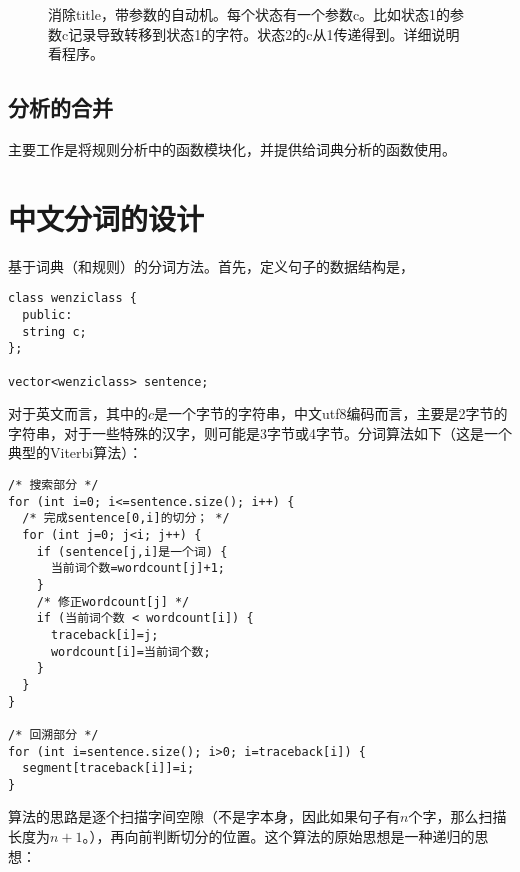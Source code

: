 \documentclass{article}
\begin{document}
\begin{CJK}{UTF8}{gbsn}
\begin{figure}
\begin{center}
\end{center}
\caption{消除title，带参数的自动机。每个状态有一个参数c。比如状态1的参数c记录导致转移到状态1的字符。状态2的c从1传递得到。详细说明看程序。}
\label{fig:title}
\end{figure}

\subsection{分析的合并}

主要工作是将规则分析中的函数模块化，并提供给词典分析的函数使用。

\section{中文分词的设计}

基于词典（和规则）的分词方法。首先，定义句子的数据结构是，

\begin{verbatim}
class wenziclass {
  public:
  string c;
};

vector<wenziclass> sentence;
\end{verbatim}

对于英文而言，其中的$c$是一个字节的字符串，中文utf8编码而言，主要是2字节的字符串，对于一些特殊的汉字，则可能是3字节或4字节。分词算法如下（这是一个典型的Viterbi算法）：

\begin{verbatim}
/* 搜索部分 */
for (int i=0; i<=sentence.size(); i++) {
  /* 完成sentence[0,i]的切分； */
  for (int j=0; j<i; j++) {
    if (sentence[j,i]是一个词) {
      当前词个数=wordcount[j]+1;
    }
    /* 修正wordcount[j] */
    if (当前词个数 < wordcount[i]) {
      traceback[i]=j;
      wordcount[i]=当前词个数;
    }
  }
}

/* 回溯部分 */
for (int i=sentence.size(); i>0; i=traceback[i]) {
  segment[traceback[i]]=i;
}
\end{verbatim}

算法的思路是逐个扫描字间空隙（不是字本身，因此如果句子有$n$个字，那么扫描长度为$n+1$。），再向前判断切分的位置。这个算法的原始思想是一种递归的思想：


\end{CJK}
\end{document}
